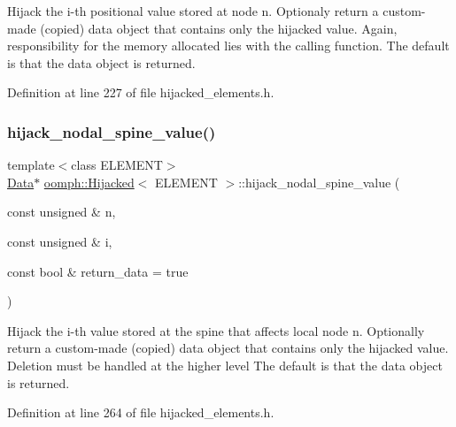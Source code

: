 Hijack the i-\/th positional value stored at node n. Optionaly return a custom-\/made (copied) data object that contains only the hijacked value. Again, responsibility for the memory allocated lies with the calling function. The default is that the data object is returned. 



Definition at line 227 of file hijacked\+\_\+elements.\+h.

\mbox{\label{classoomph_1_1Hijacked_a3d4f055a9ade75b19d69d8aa7eb26417}} 
\subsubsection{\texorpdfstring{hijack\+\_\+nodal\+\_\+spine\+\_\+value()}{hijack\_nodal\_spine\_value()}}
{\footnotesize\ttfamily template$<$class E\+L\+E\+M\+E\+NT$>$ \\
\hyperlink{classoomph_1_1Data}{Data}$\ast$ \hyperlink{classoomph_1_1Hijacked}{oomph\+::\+Hijacked}$<$ E\+L\+E\+M\+E\+NT $>$\+::hijack\+\_\+nodal\+\_\+spine\+\_\+value (\begin{DoxyParamCaption}\item[{const unsigned \&}]{n,  }\item[{const unsigned \&}]{i,  }\item[{const bool \&}]{return\+\_\+data = {\ttfamily true} }\end{DoxyParamCaption})\hspace{0.3cm}{\ttfamily [inline]}}



Hijack the i-\/th value stored at the spine that affects local node n. Optionally return a custom-\/made (copied) data object that contains only the hijacked value. Deletion must be handled at the higher level The default is that the data object is returned. 



Definition at line 264 of file hijacked\+\_\+elements.\+h.

\mbox{\label{classoomph_1_1Hijacked_acd1255b8d3783d0bce222095f9f78aa2}} 
